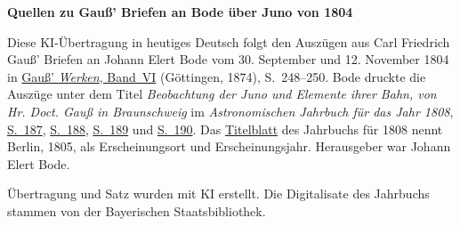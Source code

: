 \clearpage\thispagestyle{empty}
\begin{center}\textbf{Quellen zu Gauß’ Briefen an Bode über Juno von 1804}\end{center}
\noindent Diese KI-Übertragung in heutiges Deutsch folgt den Auszügen aus Carl Friedrich Gauß’ Briefen an Johann Elert Bode vom 30. September und 12. November 1804 in \href{https://gdz.sub.uni-goettingen.de/id/PPN236007467}{Gauß’ \textit{Werken}, Band~VI} (Göttingen, 1874), S.~248--250. Bode druckte die Auszüge unter dem Titel \textit{Beobachtung der Juno und Elemente ihrer Bahn, von Hr. Doct. Gauß in Braunschweig} im \textit{Astronomischen Jahrbuch für das Jahr 1808}, \href{https://www.digitale-sammlungen.de/en/view/bsb10538337?page=197}{S.~187}, \href{https://www.digitale-sammlungen.de/en/view/bsb10538337?page=198}{S.~188}, \href{https://www.digitale-sammlungen.de/en/view/bsb10538337?page=199}{S.~189} und \href{https://www.digitale-sammlungen.de/en/view/bsb10538337?page=200}{S.~190}. Das \href{https://www.digitale-sammlungen.de/en/view/bsb10538337?page=7}{Titelblatt} des Jahrbuchs für 1808 nennt Berlin, 1805, als Erscheinungsort und Erscheinungsjahr. Herausgeber war Johann Elert Bode.
\par\smallskip\noindent Übertragung und Satz wurden mit KI erstellt. Die Digitalisate des Jahrbuchs stammen von der Bayerischen Staatsbibliothek.
\clearpage
